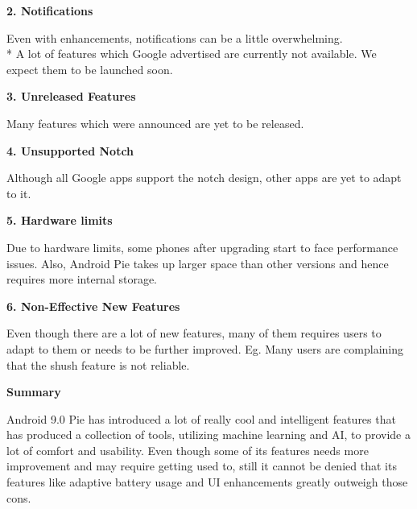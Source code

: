 \documentclass[12pt]{article}
\begin{document}
\textbf{\textcolor[HTML]{4A4A4A}{2. Notifications}}\par

\textcolor[HTML]{4A4A4A}{Even with enhancements, notifications can be a little overwhelming.
\\*
A lot of features which Google advertised are currently not available. We expect them to be launched soon.}\par

\textbf{\textcolor[HTML]{4A4A4A}{3. Unreleased Features}}\par

\textcolor[HTML]{4A4A4A}{
Many features which were announced are yet to be released.}\par

\textbf{\textcolor[HTML]{4A4A4A}{4. Unsupported Notch}}\par

\textcolor[HTML]{4A4A4A}{
Although all Google apps support the notch design, other apps are yet to adapt to it.}\par

\textbf{\textcolor[HTML]{4A4A4A}{5. Hardware limits}}\par

\textcolor[HTML]{4A4A4A}{
Due to hardware limits, some phones after upgrading start to face performance issues. Also, Android Pie takes up larger space than other versions and hence requires more internal storage.}\par

\textbf{\textcolor[HTML]{4A4A4A}{6. Non-Effective New Features}}\par

\textcolor[HTML]{4A4A4A}{
Even though there are a lot of new features, many of them requires users to adapt to them or needs to be further improved. Eg. Many users are complaining that the shush feature is not reliable.}\par

\par

{\fontsize{20pt}{22.6pt}\selectfont \textbf{Summary}\par}\par 
\textcolor[HTML]{4A4A4A}{Android 9.0 Pie has introduced a lot of really cool and intelligent features that has produced a collection of tools, utilizing machine learning and AI, to provide a lot of comfort and usability. Even though some of its features needs more improvement and may require getting used to, still it cannot be denied that its features like adaptive battery usage and UI enhancements greatly outweigh those cons.}
\par

\vspace{\baselineskip}

\end{document}

